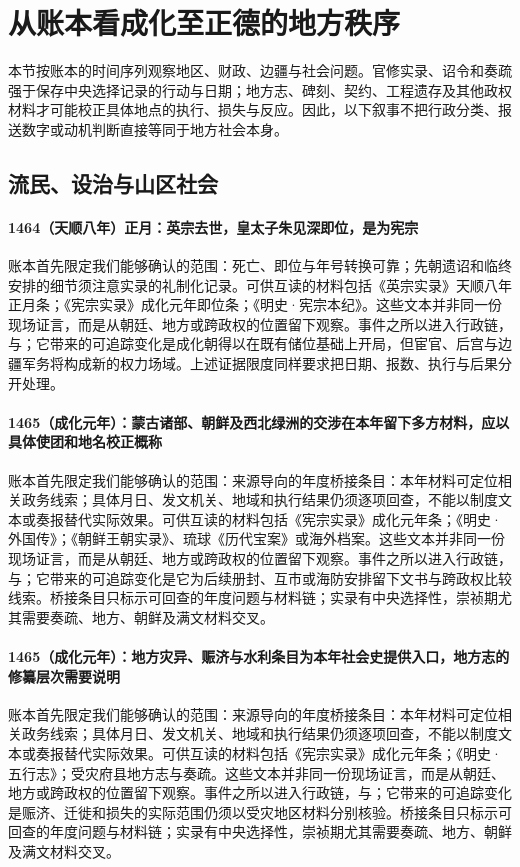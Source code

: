 \section{从账本看成化至正德的地方秩序}

本节按账本的时间序列观察地区、财政、边疆与社会问题。官修实录、诏令和奏疏强于保存中央选择记录的行动与日期；地方志、碑刻、契约、工程遗存及其他政权材料才可能校正具体地点的执行、损失与反应。因此，以下叙事不把行政分类、报送数字或动机判断直接等同于地方社会本身。

\subsection{流民、设治与山区社会}

\paragraph{1464（天顺八年）正月：英宗去世，皇太子朱见深即位，是为宪宗} 账本首先限定我们能够确认的范围：死亡、即位与年号转换可靠；先朝遗诏和临终安排的细节须注意实录的礼制化记录。可供互读的材料包括《英宗实录》天顺八年正月条；《宪宗实录》成化元年即位条；《明史·宪宗本纪》。这些文本并非同一份现场证言，而是从朝廷、地方或跨政权的位置留下观察。事件之所以进入行政链，与；它带来的可追踪变化是成化朝得以在既有储位基础上开局，但宦官、后宫与边疆军务将构成新的权力场域。上述证据限度同样要求把日期、报数、执行与后果分开处理。

\paragraph{1465（成化元年）：蒙古诸部、朝鲜及西北绿洲的交涉在本年留下多方材料，应以具体使团和地名校正概称} 账本首先限定我们能够确认的范围：来源导向的年度桥接条目：本年材料可定位相关政务线索；具体月日、发文机关、地域和执行结果仍须逐项回查，不能以制度文本或奏报替代实际效果。可供互读的材料包括《宪宗实录》成化元年条；《明史·外国传》；《朝鲜王朝实录》、琉球《历代宝案》或海外档案。这些文本并非同一份现场证言，而是从朝廷、地方或跨政权的位置留下观察。事件之所以进入行政链，与；它带来的可追踪变化是它为后续册封、互市或海防安排留下文书与跨政权比较线索。桥接条目只标示可回查的年度问题与材料链；实录有中央选择性，崇祯期尤其需要奏疏、地方、朝鲜及满文材料交叉。

\paragraph{1465（成化元年）：地方灾异、赈济与水利条目为本年社会史提供入口，地方志的修纂层次需要说明} 账本首先限定我们能够确认的范围：来源导向的年度桥接条目：本年材料可定位相关政务线索；具体月日、发文机关、地域和执行结果仍须逐项回查，不能以制度文本或奏报替代实际效果。可供互读的材料包括《宪宗实录》成化元年条；《明史·五行志》；受灾府县地方志与奏疏。这些文本并非同一份现场证言，而是从朝廷、地方或跨政权的位置留下观察。事件之所以进入行政链，与；它带来的可追踪变化是赈济、迁徙和损失的实际范围仍须以受灾地区材料分别核验。桥接条目只标示可回查的年度问题与材料链；实录有中央选择性，崇祯期尤其需要奏疏、地方、朝鲜及满文材料交叉。

